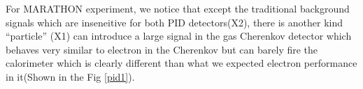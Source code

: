 For MARATHON experiment, we notice that except the traditional background signals which are inseneitive for both PID detectors(X2), there is another kind “particle” (X1) can introduce a large signal in the gas Cherenkov detector which behaves very similar to electron in the Cherenkov but can barely fire the calorimeter which is clearly different than what we expected electron performance in it(Shown in the Fig \ref{pid1}).
\begin{figure}[htbp]

\end{figure}
